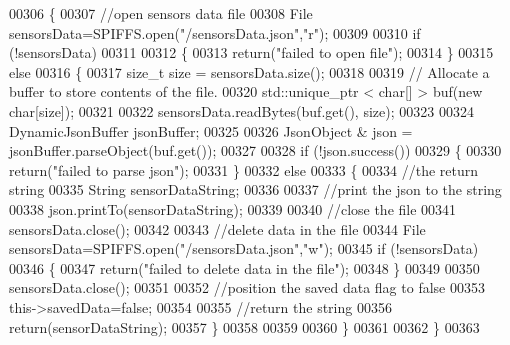 \begin{DoxyCode}
00306 \{
00307     \textcolor{comment}{//open sensors data file}
00308     File sensorsData=SPIFFS.open(\textcolor{stringliteral}{"/sensorsData.json"},\textcolor{stringliteral}{"r"});
00309     
00310     \textcolor{keywordflow}{if} (!sensorsData)
00311 
00312     \{
00313         \textcolor{keywordflow}{return}(\textcolor{stringliteral}{"failed to open file"});
00314     \}
00315     \textcolor{keywordflow}{else}
00316     \{
00317         \textcolor{keywordtype}{size\_t} size = sensorsData.size();
00318 
00319         \textcolor{comment}{// Allocate a buffer to store contents of the file.}
00320         std::unique\_ptr < char[] > buf(\textcolor{keyword}{new} \textcolor{keywordtype}{char}[size]);
00321 
00322         sensorsData.readBytes(buf.get(), size);
00323 
00324         DynamicJsonBuffer jsonBuffer;
00325 
00326         JsonObject & json = jsonBuffer.parseObject(buf.get());
00327         
00328         \textcolor{keywordflow}{if} (!json.success())
00329         \{
00330             \textcolor{keywordflow}{return}(\textcolor{stringliteral}{"failed to parse json"});
00331         \}
00332         \textcolor{keywordflow}{else}
00333         \{   
00334             \textcolor{comment}{//the return string}
00335             String sensorDataString;
00336             
00337             \textcolor{comment}{//print the json to the string}
00338             json.printTo(sensorDataString);
00339             
00340             \textcolor{comment}{//close the file}
00341             sensorsData.close();
00342 
00343             \textcolor{comment}{//delete data in the file}
00344             File sensorsData=SPIFFS.open(\textcolor{stringliteral}{"/sensorsData.json"},\textcolor{stringliteral}{"w"});
00345             \textcolor{keywordflow}{if} (!sensorsData)   
00346             \{
00347                 \textcolor{keywordflow}{return}(\textcolor{stringliteral}{"failed to delete data in the file"});
00348             \}
00349 
00350             sensorsData.close();
00351             
00352             \textcolor{comment}{//position the saved data flag to false}
00353             this->savedData=\textcolor{keyword}{false};          
00354 
00355             \textcolor{comment}{//return the string}
00356             \textcolor{keywordflow}{return}(sensorDataString);       
00357         \}
00358         
00359         
00360     \}
00361 
00362 \}
00363 
\end{DoxyCode}
